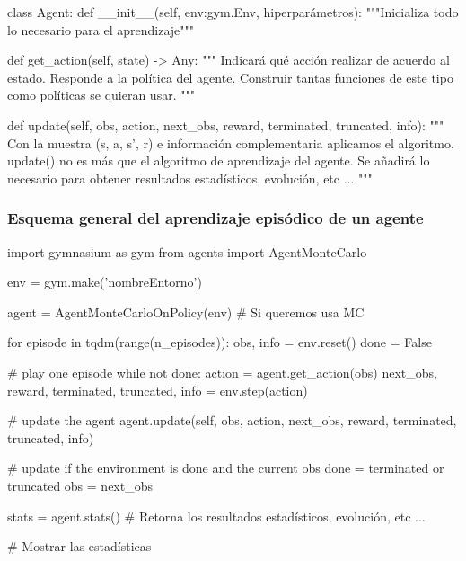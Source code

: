 \documentclass[a4paper, 11pt]{article}
\begin{document}
\begin{pyverbatim}[][frame=single, fontsize=\scriptsize]
class Agent:
    def __init__(self, env:gym.Env, hiperparámetros):
       """Inicializa todo lo necesario para el aprendizaje"""
       
       
    def get_action(self, state) -> Any:
        """
        Indicará qué acción realizar de acuerdo al estado.
        Responde a la política del agente.
        Construir tantas funciones de este tipo como políticas se quieran usar.
        """
        
    def update(self, obs, action, next_obs, reward, terminated, truncated, info):
        """
        Con la muestra (s, a, s', r) e información complementaria aplicamos el algoritmo.
        update() no es más que el algoritmo de aprendizaje del agente.
        Se añadirá lo necesario para obtener resultados estadísticos, evolución, etc ...
        """      
\end{pyverbatim} 




\subsubsection*{Esquema general del aprendizaje episódico de un agente}


\begin{pyverbatim}[][frame=single, fontsize=\scriptsize]
import gymnasium as gym
from agents import AgentMonteCarlo

env = gym.make('nombreEntorno')

agent = AgentMonteCarloOnPolicy(env) # Si queremos usa MC

for episode in tqdm(range(n_episodes)):
    obs, info = env.reset()
    done = False

    # play one episode
    while not done:
        action = agent.get_action(obs)
        next_obs, reward, terminated, truncated, info = env.step(action)

        # update the agent
        agent.update(self, obs, action, next_obs, reward, terminated, truncated, info)

        # update if the environment is done and the current obs
        done = terminated or truncated
        obs = next_obs
        
stats = agent.stats()  # Retorna los resultados estadísticos, evolución, etc ...

# Mostrar las estadísticas
\end{pyverbatim} 
\end{document}
